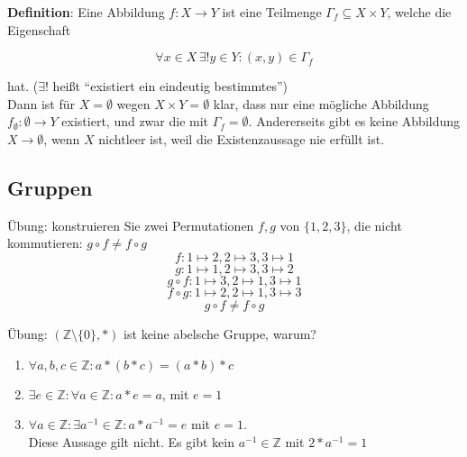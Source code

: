 \documentclass{article}
\begin{document}
\textbf{Definition}: Eine Abbildung $f \colon X \to Y$ ist eine Teilmenge $\Gamma_f \subseteq X \times Y$,
welche die Eigenschaft

\[
  \forall x \in X \hspace{2pt} \exists! y \in Y \colon (x, y) \in \Gamma_f
\]

hat. ($\exists!$ heißt ``existiert ein eindeutig bestimmtes'') \\

Dann ist für $X = \emptyset$ wegen $X \times Y = \emptyset$ klar, dass nur eine mögliche Abbildung
$f_\emptyset \colon \emptyset \to Y$ existiert, und zwar die mit $\Gamma_f = \emptyset$. Andererseits
gibt es keine Abbildung $X \to \emptyset$, wenn $X$ nichtleer ist, weil die Existenzaussage nie
erfüllt ist.

\subsection*{Gruppen}


Übung: konstruieren Sie zwei Permutationen $f, g$ von $\{ 1, 2, 3 \}$,
die nicht kommutieren: $g \circ f \ne  f \circ g$
\[
  f \colon 1 \mapsto 2, 2 \mapsto 3, 3 \mapsto 1
\]
\[
  g \colon 1 \mapsto 1, 2 \mapsto 3, 3 \mapsto 2
\]
\[
  g \circ f \colon 1 \mapsto 3, 2 \mapsto 1, 3 \mapsto 1
\]
\[
  f \circ g \colon 1 \mapsto 2, 2 \mapsto 1, 3 \mapsto 3
\]
\[
  g \circ f \ne f \circ g
\]

Übung: $(\mathbb{Z} \setminus \{ 0 \}, *)$ ist keine abelsche Gruppe, warum?

\begin{enumerate}[label=(G\arabic*)]
\item $\forall a,b,c \in \mathbb{Z} \colon a * (b * c) = (a * b) * c$
\item $\exists e \in \mathbb{Z} \colon \forall a \in \mathbb{Z} \colon a * e = a$, mit $e = 1$
\item $\forall a \in \mathbb{Z} \colon \exists a^{-1} \in \mathbb{Z} \colon a * a^{-1} = e$ mit $e = 1$. \\
  Diese Aussage gilt nicht. Es gibt kein $a^{-1} \in \mathbb{Z}$ mit $2 * a^{-1} = 1$
\end{enumerate}
\end{document}
